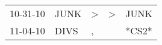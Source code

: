 \begin{supertabular}{lllll}
 10-31-10 &  JUNK &  \textgreater &  \textgreater &   JUNK \\
 11-04-10 &  DIVS &             , &               &  *CS2* \\
\end{supertabular}
